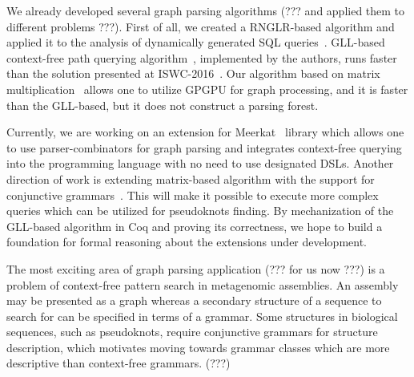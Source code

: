 \documentclass{vldb}
\begin{document}
We already developed several graph parsing algorithms (??? and applied them to different problems ???). 
First of all, we created a RNGLR-based algorithm and applied it to the analysis of dynamically generated SQL queries~\cite{RelaxedRNGLR}.
GLL-based context-free path querying algorithm~\cite{GraphGLL}, implemented by the authors, runs faster than the solution presented at ISWC-2016~\cite{CFRDFParsing}. 
Our algorithm based on matrix multiplication~\cite{GraphParsingMatrix} allows one to utilize GPGPU for graph processing, and it is faster than the GLL-based, but it does not construct a parsing forest.

Currently, we are working on an extension for Meerkat~\cite{Meerkat} library which allows one to use parser-combinators for graph parsing and integrates context-free querying into the programming language with no need to use designated DSLs.
Another direction of work is extending matrix-based algorithm with the support for conjunctive grammars~\cite{Okhotin}.
This will make it possible to execute more complex queries which can be utilized for pseudoknots finding.
By mechanization of the GLL-based algorithm in Coq and proving its correctness, we hope to build a foundation for formal reasoning about the extensions under development.

The most exciting area of graph parsing application (??? for us now ???) is a problem of context-free pattern search in metagenomic assemblies. 
An assembly may be presented as a graph whereas a secondary structure of a sequence to search for can be specified in terms of a grammar. 
Some structures in biological sequences, such as pseudoknots, require conjunctive grammars for structure description, which motivates moving towards grammar classes which are more descriptive than context-free grammars. (???)
\end{document}
